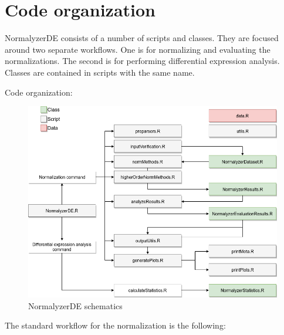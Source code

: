 \documentclass[]{article}
\begin{document}
\hypertarget{code-organization}{%
\section{Code organization}\label{code-organization}}

NormalyzerDE consists of a number of scripts and classes. They are focused around
two separate workflows. One is for normalizing and evaluating the normalizations. The
second is for performing differential expression analysis. Classes are contained in scripts with the same name.

Code organization:

\begin{figure}
\centering
\includegraphics{180813_normalyzerde_schematics.png}
\caption{NormalyzerDE schematics}
\end{figure}

The standard workflow for the normalization is the following:
\end{document}
